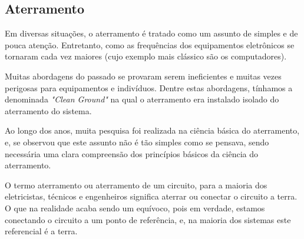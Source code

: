 \subsection{Aterramento} \label{subsection: grounding}

Em diversas situações, o aterramento é tratado como um assunto de simples e de pouca atenção. Entretanto, como as frequências dos equipamentos eletrônicos se tornaram cada vez maiores (cujo exemplo mais clássico são os computadores).

Muitas abordagens do passado se provaram serem ineficientes e muitas vezes perigosas para equipamentos e indivíduos. Dentre estas abordagens, tínhamos a denominada \textit{"Clean Ground"} na qual o aterramento era instalado isolado do aterramento do sistema.

Ao longo dos anos, muita pesquisa foi realizada na ciência básica do aterramento, e, se observou que este assunto não é tão simples como se pensava, sendo necessária uma clara compreensão dos princípios básicos da ciência do aterramento.

O termo aterramento ou aterramento de um circuito, para a maioria dos eletricistas, técnicos e engenheiros significa aterrar ou conectar o circuito a terra. O que na realidade acaba sendo um equívoco, pois em verdade, estamos conectando o circuito a um ponto de referência, e, na maioria dos sistemas este referencial é a terra.

%

%

%